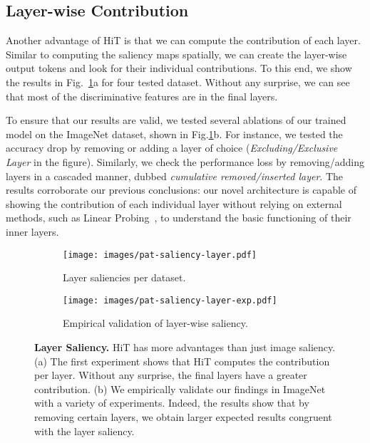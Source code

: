 \subsection{Layer-wise Contribution}

Another advantage of HiT is that we can compute the contribution of each layer. 
Similar to computing the saliency maps spatially, we can create the layer-wise output tokens and look for their individual contributions. 
To this end, we show the results in Fig.~\ref{fig:layer-saliency}a for four tested dataset.
Without any surprise, we can see that most of the discriminative features are in the final layers. 

To ensure that our results are valid, we tested several ablations of our trained model on the ImageNet dataset, shown in Fig.\ref{fig:layer-saliency}b. 
For instance, we tested the accuracy drop by removing or adding a layer of choice (\emph{Excluding/Exclusive Layer} in the figure). 
Similarly, we check the performance loss by removing/adding layers in a cascaded manner, dubbed \emph{cumulative removed/inserted layer}. 
The results corroborate our previous conclusions: our novel architecture is capable of showing the contribution of each individual layer without relying on external methods, such as Linear Probing~\cite{alain2016understanding}, to understand the basic functioning of their inner layers.

\begin{figure}[t]
\begin{subfigure}{0.495\textwidth}
    \centering
    \texttt{[image: images/pat-saliency-layer.pdf]}
    \caption{Layer saliencies per dataset.}
\end{subfigure}
\begin{subfigure}{0.495\textwidth}
    \centering
    \texttt{[image: images/pat-saliency-layer-exp.pdf]}
    \caption{Empirical validation of layer-wise saliency.}
\end{subfigure}
    \caption{\textbf{Layer Saliency.} HiT has more advantages than just image saliency. (a) The first experiment shows that HiT computes the contribution per layer. Without any surprise, the final layers have a greater contribution. (b) We empirically validate our findings in ImageNet with a variety of experiments. Indeed, the results show that by removing certain layers, we obtain larger expected results congruent with the layer saliency.}
    \label{fig:layer-saliency}
    \vspace{-3mm}
\end{figure}

